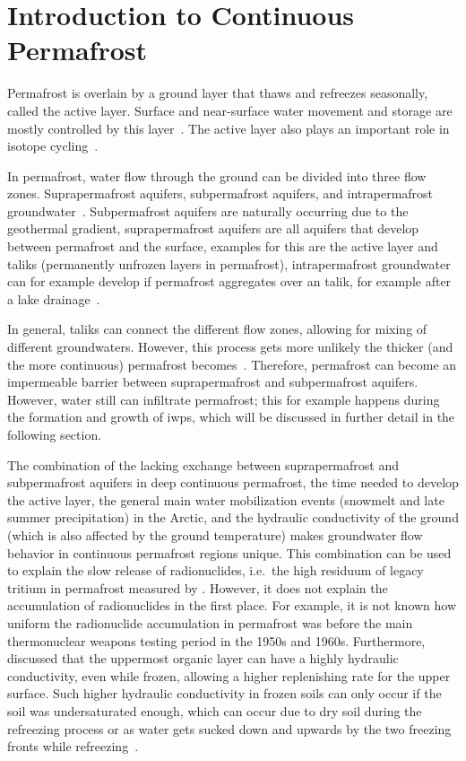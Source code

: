 \chapter{Introduction to Continuous Permafrost}
Permafrost is overlain by a ground layer that thaws and refreezes seasonally, called the active layer. Surface and near-surface water movement and storage are mostly controlled by this layer~\citep{walvoordHydrologicImpactsThawing2016}. The active layer also plays an important role in isotope cycling~\citep{tetzlaffTracerbasedAssessmentFlow2015}.

In permafrost, water flow through the ground can be divided into three flow zones. Suprapermafrost aquifers, subpermafrost aquifers, and intrapermafrost groundwater~\citep{walvoordHydrologicImpactsThawing2016,wooPermafrostHydrology2012}. Subpermafrost aquifers are naturally occurring due to the geothermal gradient, suprapermafrost aquifers are all aquifers that develop between permafrost and the surface, examples for this are the active layer and taliks (permanently unfrozen layers in permafrost), intrapermafrost groundwater can for example develop if permafrost aggregates over an talik, for example after a lake drainage~\citep{walvoordHydrologicImpactsThawing2016,wooPermafrostHydrology2012}.

In general, taliks can connect the different flow zones, allowing for mixing of different groundwaters. However, this process gets more unlikely the thicker (and the more continuous) permafrost becomes~\citep{wooPermafrostHydrology2012}. Therefore, permafrost can become an impermeable barrier between suprapermafrost and subpermafrost aquifers. However, water still can infiltrate permafrost; this for example happens during the formation and growth of \glspl{iwp}, which will be discussed in further detail in the following section.

The combination of the lacking exchange between suprapermafrost and subpermafrost aquifers in deep continuous permafrost, the time needed to develop the active layer, the general main water mobilization events (snowmelt and late summer precipitation) in the Arctic, and the hydraulic conductivity of the ground (which is also affected by the ground temperature) makes groundwater flow behavior in continuous permafrost regions unique. 
This combination can be used to explain the slow release of radionuclides, i.e.\ the high residuum of legacy tritium in permafrost measured by \citet{bondPermafrostThawImplications2018}. However, it does not explain the accumulation of radionuclides in the first place. For example, it is not known how uniform the radionuclide accumulation in permafrost was before the main thermonuclear weapons testing period in the 1950s and 1960s. 
Furthermore, \citet{quintonSubsurfaceDrainageHummockcovered2000} discussed that the uppermost organic layer can have a highly hydraulic conductivity, even while frozen, allowing a higher replenishing rate for the upper surface. Such higher hydraulic conductivity in frozen soils can only occur if the soil was undersaturated enough, which can occur due to dry soil during the refreezing process or as water gets sucked down and upwards by the two freezing fronts while refreezing~\citep{mackayOriginHummocksWestern1980}.

